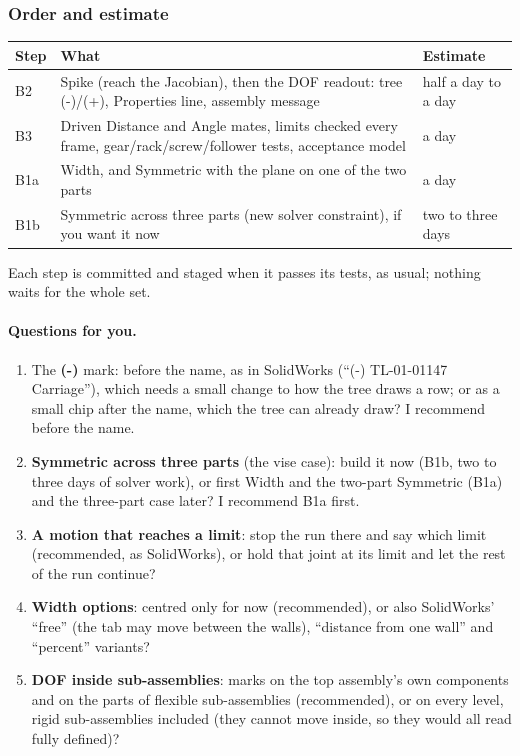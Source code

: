 \subsubsection*{Order and estimate}
\begin{center}\small
\begin{tabularx}{\linewidth}{@{}lXl@{}}
\toprule
Step & What & Estimate\\
\midrule
B2 & Spike (reach the Jacobian), then the DOF readout: tree (-)/(+), Properties line, assembly message & half a day to a day\\
B3 & Driven Distance and Angle mates, limits checked every frame, gear/rack/screw/follower tests, acceptance model & a day\\
B1a & Width, and Symmetric with the plane on one of the two parts & a day\\
B1b & Symmetric across three parts (new solver constraint), if you want it now & two to three days\\
\bottomrule
\end{tabularx}
\end{center}
Each step is committed and staged when it passes its tests, as usual; nothing waits for the whole set.

\paragraph{Questions for you.}
\begin{enumerate}
  \item The \textbf{(-)} mark: before the name, as in SolidWorks (``(-) TL-01-01147 Carriage''), which needs a
        small change to how the tree draws a row; or as a small chip after the name, which the tree can already
        draw? I recommend before the name.
  \item \textbf{Symmetric across three parts} (the vise case): build it now (B1b, two to three days of solver work),
        or first Width and the two-part Symmetric (B1a) and the three-part case later? I recommend B1a first.
  \item \textbf{A motion that reaches a limit}: stop the run there and say which limit (recommended, as
        SolidWorks), or hold that joint at its limit and let the rest of the run continue?
  \item \textbf{Width options}: centred only for now (recommended), or also SolidWorks' ``free'' (the tab may move
        between the walls), ``distance from one wall'' and ``percent'' variants?
  \item \textbf{DOF inside sub-assemblies}: marks on the top assembly's own components and on the parts of
        flexible sub-assemblies (recommended), or on every level, rigid sub-assemblies included (they cannot move
        inside, so they would all read fully defined)?
\end{enumerate}
